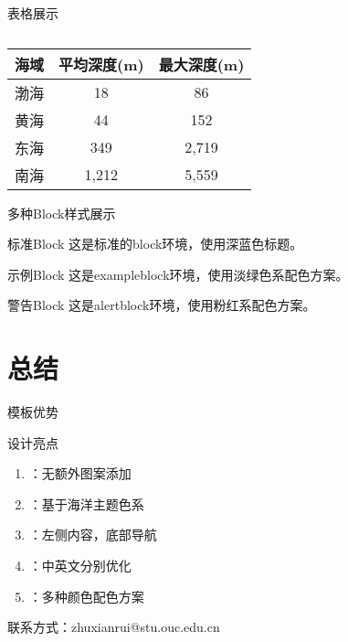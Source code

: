 \documentclass{beamer}
\begin{document}
\begin{frame}{表格展示}
    \begin{table}
        \centering
        \caption{}
        \begin{tabular}{@{}lcc@{}}
            \toprule
            \textbf{海域} & \textbf{平均深度(m)} & \textbf{最大深度(m)} \\
            \midrule
            渤海 & 18 & 86 \\
            黄海 & 44 & 152 \\
            东海 & 349 & 2,719 \\
            南海 & 1,212 & 5,559 \\
            \bottomrule
        \end{tabular}
    \end{table}
\end{frame}

\begin{frame}{多种Block样式展示}
    \begin{block}{标准Block}
        这是标准的block环境，使用深蓝色标题。
    \end{block}
    
    \begin{exampleblock}{示例Block}
        这是exampleblock环境，使用淡绿色系配色方案。
    \end{exampleblock}
    
    \begin{alertblock}{警告Block}
        这是alertblock环境，使用粉红系配色方案。
    \end{alertblock}
\end{frame}

\section{总结}

\begin{frame}{模板优势}
    \begin{alertblock}{设计亮点}
        \begin{enumerate}
            \item {}：无额外图案添加
            \item {}：基于海洋主题色系
            \item {}：左侧内容，底部导航
            \item {}：中英文分别优化
            \item {}：多种颜色配色方案
        \end{enumerate}
    \end{alertblock}
    
    \vskip 0.5cm
    \centerline{\Large {}}
\end{frame}

\begin{frame}{}
    \centering
    \vspace{2cm}
    
    {\Huge {}}
    
    \vspace{1cm}
    
    {\Large {}}
    
    \vspace{1cm}
    
    {\normalsize 联系方式：zhuxianrui@stu.ouc.edu.cn}
\end{frame}
\end{document}
